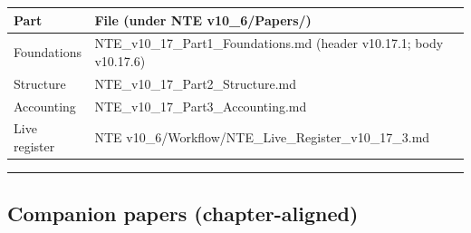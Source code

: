 \documentclass[
  11pt,
]{article}
\newcounter{none} %
\begin{document}
{\def\LTcaptype{none} %
\begin{longtable}[]{@{}
  >{\raggedright\arraybackslash}p{}
  >{\raggedright\arraybackslash}p{}@{}}
\toprule\noalign{}
\begin{minipage}[b]{\linewidth}\raggedright
Part
\end{minipage} & \begin{minipage}[b]{\linewidth}\raggedright
File (under NTE v10\_6/Papers/)
\end{minipage} \\
\midrule\noalign{}
\endhead
\bottomrule\noalign{}
\endlastfoot
Foundations & NTE\_v10\_17\_Part1\_Foundations.md (header v10.17.1; body
v10.17.6) \\
Structure & NTE\_v10\_17\_Part2\_Structure.md \\
Accounting & NTE\_v10\_17\_Part3\_Accounting.md \\
Live register & NTE
v10\_6/Workflow/NTE\_Live\_Register\_v10\_17\_3.md \\
\end{longtable}
}

\begin{center}\rule{0.5\linewidth}{0.5pt}\end{center}

\subsection{Companion papers
(chapter-aligned)}\label{companion-papers-chapter-aligned}
\end{document}
